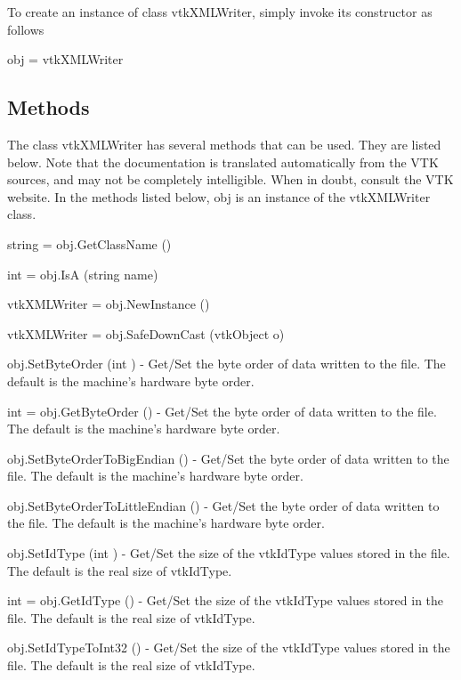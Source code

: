 To create an instance of class vtk\-X\-M\-L\-Writer, simply invoke its constructor as follows \begin{DoxyVerb}  obj = vtkXMLWriter
\end{DoxyVerb}
 \hypertarget{vtkwidgets_vtkxyplotwidget_Methods}{}\subsection{Methods}\label{vtkwidgets_vtkxyplotwidget_Methods}
The class vtk\-X\-M\-L\-Writer has several methods that can be used. They are listed below. Note that the documentation is translated automatically from the V\-T\-K sources, and may not be completely intelligible. When in doubt, consult the V\-T\-K website. In the methods listed below, {\ttfamily obj} is an instance of the vtk\-X\-M\-L\-Writer class. 
\begin{DoxyItemize}
\item {\ttfamily string = obj.\-Get\-Class\-Name ()}  
\item {\ttfamily int = obj.\-Is\-A (string name)}  
\item {\ttfamily vtk\-X\-M\-L\-Writer = obj.\-New\-Instance ()}  
\item {\ttfamily vtk\-X\-M\-L\-Writer = obj.\-Safe\-Down\-Cast (vtk\-Object o)}  
\item {\ttfamily obj.\-Set\-Byte\-Order (int )} -\/ Get/\-Set the byte order of data written to the file. The default is the machine's hardware byte order.  
\item {\ttfamily int = obj.\-Get\-Byte\-Order ()} -\/ Get/\-Set the byte order of data written to the file. The default is the machine's hardware byte order.  
\item {\ttfamily obj.\-Set\-Byte\-Order\-To\-Big\-Endian ()} -\/ Get/\-Set the byte order of data written to the file. The default is the machine's hardware byte order.  
\item {\ttfamily obj.\-Set\-Byte\-Order\-To\-Little\-Endian ()} -\/ Get/\-Set the byte order of data written to the file. The default is the machine's hardware byte order.  
\item {\ttfamily obj.\-Set\-Id\-Type (int )} -\/ Get/\-Set the size of the vtk\-Id\-Type values stored in the file. The default is the real size of vtk\-Id\-Type.  
\item {\ttfamily int = obj.\-Get\-Id\-Type ()} -\/ Get/\-Set the size of the vtk\-Id\-Type values stored in the file. The default is the real size of vtk\-Id\-Type.  
\item {\ttfamily obj.\-Set\-Id\-Type\-To\-Int32 ()} -\/ Get/\-Set the size of the vtk\-Id\-Type values stored in the file. The default is the real size of vtk\-Id\-Type.  

\end{DoxyItemize}

